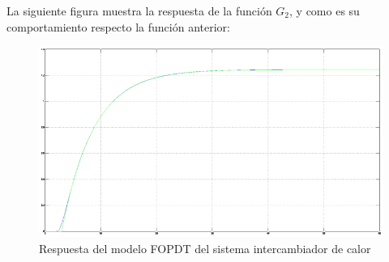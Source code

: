 \documentclass[twocolumn]{IEEEtran}
\begin{document}
\noindent
La siguiente figura muestra la respuesta de la función $G_2$, y como es su comportamiento respecto la función anterior:
\begin{figure}[H]
	\centering
		\includegraphics[scale=0.3]{simulation12.png}
	\caption{Respuesta del modelo FOPDT del sistema intercambiador de calor}
	\label{fig14}
\end{figure}
\end{document}
